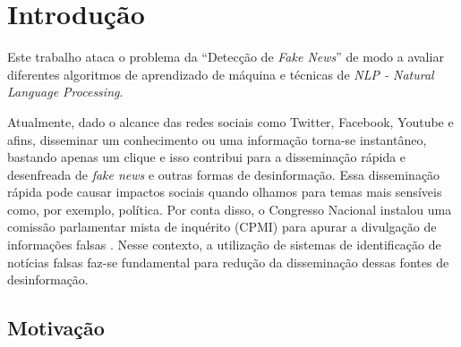 \section{Introdução}


 Este trabalho ataca o problema da ``Detecção de \textit{Fake News}''\cite{ZHANG2020102025} de modo a avaliar diferentes algoritmos de aprendizado de máquina e técnicas de \textit{NLP - \textit{Natural Language Processing}}. 

Atualmente, dado o alcance das redes sociais como Twitter, Facebook, Youtube e afins, disseminar um conhecimento ou uma informação torna-se instantâneo, bastando apenas um clique e isso contribui para a disseminação rápida e desenfreada de \textit{fake news} e outras formas de desinformação. Essa disseminação rápida pode causar impactos sociais quando olhamos para temas mais sensíveis como, por exemplo, política. Por conta disso, o Congresso Nacional instalou uma comissão parlamentar mista de inquérito (CPMI)  para apurar a divulgação de informações falsas \citep{g12019}. Nesse contexto, a utilização de sistemas de identificação de notícias falsas faz-se fundamental para redução da disseminação dessas fontes de desinformação.






\subsection{Motivação}




